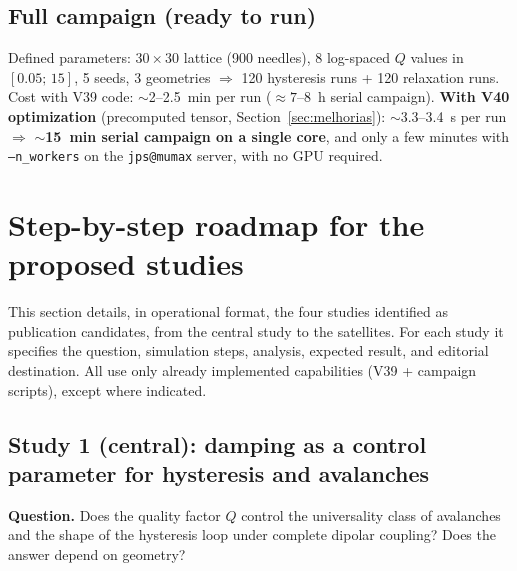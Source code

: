 \documentclass[11pt,a4paper]{article}
\newcommand{\code}[1]{\texttt{#1}}
\begin{document}
\subsection{Full campaign (ready to run)}

Defined parameters: $30\times30$ lattice (900 needles), 8 log-spaced $Q$ values in $[0.05;\,15]$, 5 seeds, 3 geometries $\Rightarrow$ 120 hysteresis runs + 120 relaxation runs. Cost with V39 code: $\sim$2--2.5~min per run ($\approx 7$--8~h serial campaign). \textbf{With V40 optimization} (precomputed tensor, Section~\ref{sec:melhorias}): $\sim$3.3--3.4~s per run $\Rightarrow$ \textbf{$\sim$15~min serial campaign on a single core}, and only a few minutes with \code{--n\_workers} on the \code{jps@mumax} server, with no GPU required.

\section{Step-by-step roadmap for the proposed studies}
\label{sec:roteiro}

This section details, in operational format, the four studies identified as publication candidates, from the central study to the satellites. For each study it specifies the question, simulation steps, analysis, expected result, and editorial destination. All use only already implemented capabilities (V39 + campaign scripts), except where indicated.

\subsection{Study 1 (central): damping as a control parameter for hysteresis and avalanches}

\textbf{Question.} Does the quality factor $Q$ control the universality class of avalanches and the shape of the hysteresis loop under complete dipolar coupling? Does the answer depend on geometry?
\end{document}
